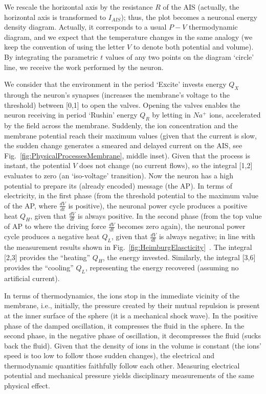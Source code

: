 We rescale the horizontal axis by the resistance $R$ of the \gls{AIS} (actually, the horizontal axis is transformed to $I_{AIS}$); thus, the plot becomes a neuronal energy density diagram.
Actually, it corresponds to a usual $P-V$ thermodynamic diagram, 
and we expect that the temperature changes in the same analogy
(we keep the convention of using the letter $V$ to denote both potential and volume).
By integrating the parametric $t$ values of any two points on the diagram ‘circle’ line, we receive the work performed by the neuron.

We consider that the environment in the period ‘Excite’ invests energy $Q_X$ through the neuron’s synapses (increases the membrane’s voltage to the threshold) between [0,1] to open the valves.
 Opening the valves enables the neuron receiving in period ‘Rushin’ energy $Q_R$ by letting in $Na^+$ ions, accelerated by the field across the membrane. Suddenly, the ion concentration and the membrane potential reach their maximum values (given that the current is slow,
 the sudden change generates a smeared and delayed current on the \gls{AIS}, see Fig.~\ref{fig:PhysicalProcessesMembrane}, middle inset). Given that the process is instant, the potential $V$ does not change (no current flows), so the integral [1,2] evaluates to zero (an ‘iso-voltage’ transition). Now the neuron has a high potential to prepare its (already encoded) message (the \gls{AP}).
In terms of electricity, in the first phase (from the threshold potential to the maximum value of the \gls{AP}, where $\frac{dV}{dt}$ is positive), the neuronal power cycle produces a positive heat $Q_H$, given that $\frac{dV}{dt}$ is always positive. 
In the second phase (from the top value of \gls{AP} to where the driving force $\frac{dV}{dt}$ becomes zero again), the neuronal power cycle produces a negative heat $Q_L$, given that $\frac{dV}{dt}$ is always negative; in line with the measurement results shown in Fig.~\ref{fig:HeimburgElascticity}~\cite{HeimburgPhysikOfNerves:2009}. The integral [2,3] provides the “heating” $Q_H$, the energy invested. Similarly, the integral [3,6] provides the “cooling” $Q_L$, representing the energy recovered (assuming no artificial current). 

In terms of thermodynamics, the ions stop in the immediate vicinity of 
the membrane, i.e., initially, the pressure created by their mutual repulsion is present at the inner surface of the sphere (it is a mechanical shock wave). In the positive phase of the damped oscillation, it compresses the fluid in the sphere. In the second phase, in the negative 
phase of oscillation, it decompresses the fluid (sucks back the fluid).
Given that the density of ions in the volume is constant
(the ions' speed is too low to follow those sudden changes),
the electrical and thermodynamic quantities faithfully follow each other.
Measuring electrical potential and mechanical pressure yields disciplinary measurements of the same physical effect.

